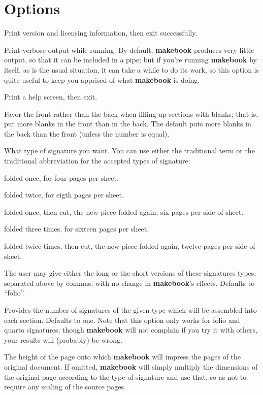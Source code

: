 \documentclass[12pt,twoside,final]{extarticle}
\begin{document}
\section{Options}
\begin{description}[noitemsep]
\item[-V]Print version and licensing information, then exit successfully.
\item[-v]Print verbose output while running. By default, \textbf{makebook} produces very little output, so that it can be included in a pipe; but if you're running \textbf{makebook} by itself, as is the usual situation, it can take a while to do its work, so this option is quite useful to keep you apprised of what \textbf{makebook} is doing.
\item[-h]Print a help screen, then exit.
\item[-f]Favor the front rather than the back when filling up sections with blanks; that is, put more blanks in the front than in the back. The default puts more blanks in the back than the front (unless the number is equal).
\item[-t \emph{signature type}]What type of signature you want. You can use either the traditional term or the traditional abbreviation for the accepted types of signature:
\begin{description}[noitemsep]
\item[folio, 2o]folded once, for four pages per sheet.
\item[quarto, 4to]folded twice, for eigth pages per sheet.
\item[sexto, 6to]folded once, then cut, the new piece folded again; six pages per side of sheet.
\item[octavo, 8vo]folded three times, for sixteen pages per sheet.
\item[duodecimo, 12mo]folded twice times, then cut, the new piece folded again; twelve pages per side of sheet.
\end{description}
The  user  may  give  either the long or the short versions of these signatures types, separated above by commas, with no change in \textbf{makebook}'s effects. Defaults to ``folio''.
\item[-n \emph{signatures per section}]Provides the number of signatures of the given type which will be assembled into each section. Defaults to one. Note that this option only works for folio and quarto signatures; though \textbf{makebook} will not complain if you try it with others, your results will (probably) be wrong.
\item[-H \emph{height of target page}]The height of the page onto which \textbf{makebook} will impress the pages of the original document. If omitted, \textbf{makebook} will simply multiply the dimensions of the original page according to the type of signature and use that, so as not to require any scaling of the source pages.

\end{description}
\end{document}
